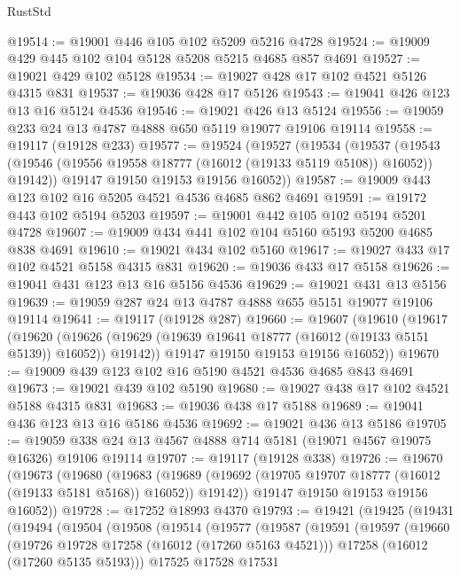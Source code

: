 \begin{lexlean}{RustStd}
\begin{coremodule}
@19514 := @19001 @446 @105 @102 @5209 @5216 @4728
@19524 := @19009 @429 @445 @102 @104 @5128 @5208 @5215 @4685 @857 @4691
@19527 := @19021 @429 @102 @5128
@19534 := @19027 @428 @17 @102 @4521 @5126 @4315 @831
@19537 := @19036 @428 @17 @5126
@19543 := @19041 @426 @123 @13 @16 @5124 @4536
@19546 := @19021 @426 @13 @5124
@19556 := @19059 @233 @24 @13 @4787 @4888 @650 @5119 @19077 @19106 @19114
@19558 := @19117 (@19128 @233)
@19577 := @19524
    (@19527
      (@19534
        (@19537
          (@19543 (@19546 (@19556 @19558 @18777 (@16012 (@19133 @5119 @5108)) @16052)) @19142))
        @19147
        @19150
        @19153
        @19156
        @16052))
@19587 := @19009 @443 @123 @102 @16 @5205 @4521 @4536 @4685 @862 @4691
@19591 := @19172 @443 @102 @5194 @5203
@19597 := @19001 @442 @105 @102 @5194 @5201 @4728
@19607 := @19009 @434 @441 @102 @104 @5160 @5193 @5200 @4685 @838 @4691
@19610 := @19021 @434 @102 @5160
@19617 := @19027 @433 @17 @102 @4521 @5158 @4315 @831
@19620 := @19036 @433 @17 @5158
@19626 := @19041 @431 @123 @13 @16 @5156 @4536
@19629 := @19021 @431 @13 @5156
@19639 := @19059 @287 @24 @13 @4787 @4888 @655 @5151 @19077 @19106 @19114
@19641 := @19117 (@19128 @287)
@19660 := @19607
    (@19610
      (@19617
        (@19620
          (@19626 (@19629 (@19639 @19641 @18777 (@16012 (@19133 @5151 @5139)) @16052)) @19142))
        @19147
        @19150
        @19153
        @19156
        @16052))
@19670 := @19009 @439 @123 @102 @16 @5190 @4521 @4536 @4685 @843 @4691
@19673 := @19021 @439 @102 @5190
@19680 := @19027 @438 @17 @102 @4521 @5188 @4315 @831
@19683 := @19036 @438 @17 @5188
@19689 := @19041 @436 @123 @13 @16 @5186 @4536
@19692 := @19021 @436 @13 @5186
@19705 := @19059 @338 @24 @13 @4567 @4888 @714 @5181 (@19071 @4567 @19075 @16326) @19106 @19114
@19707 := @19117 (@19128 @338)
@19726 := @19670
    (@19673
      (@19680
        (@19683
          (@19689 (@19692 (@19705 @19707 @18777 (@16012 (@19133 @5181 @5168)) @16052)) @19142))
        @19147
        @19150
        @19153
        @19156
        @16052))
@19728 := @17252 @18993 @4370
@19793 := @19421
    (@19425
      (@19431
        (@19494
          (@19504
            (@19508
              (@19514
                (@19577
                  (@19587
                    (@19591
                      (@19597
                        (@19660
                          (@19726 @19728 @17258 (@16012 (@17260 @5163 @4521)))
                          @17258
                          (@16012 (@17260 @5135 @5193)))
                        @17525
                        @17528
                        @17531

\end{coremodule}
\end{lexlean}
